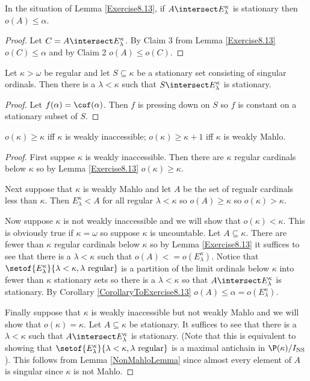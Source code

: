 \documentclass[oneside,12pt]{amsart}
\begin{document}
\begin{corollary}
\label{CorollaryToExercise8.13}
In the situation of Lemma \ref{Exercise8.13}, if $A\intersect E^{\kappa}_{\lambda}$ is stationary
then $o(A)\leq\alpha$.
\end{corollary}
\begin{proof}
Let $C=A\intersect E^{\kappa}_{\lambda}$. By Claim 3 from Lemma \ref{Exercise8.13} $o(C)\leq\alpha$ and
by Claim 2 $o(A)\leq o(C)$.
\end{proof}

\begin{lemma}
\label{NonMahloLemma}
Let $\kappa>\omega$ be regular and let $S\subseteq\kappa$ be a stationary set consisting of singular ordinals.
Then there is a $\lambda<\kappa$ such that $S\intersect E^{\kappa}_{\lambda}$ is stationary.
\end{lemma}
\begin{proof}
Let $f(\alpha)=\cof(\alpha)$. Then $f$ is pressing down on $S$ so $f$ is constant on a stationary subset of $S$.
\end{proof}

\begin{lemma}
$o(\kappa)\geq\kappa$ iff $\kappa$ is weakly inaccessible; $o(\kappa)\geq\kappa+1$ iff $\kappa$ is weakly Mahlo.
\end{lemma}
\begin{proof}
First suppse $\kappa$ is weakly inaccessible. Then there are $\kappa$ regular cardinals below $\kappa$
so by Lemma \ref{Exercise8.13} $o(\kappa)\geq\kappa$.

Next suppose that $\kappa$ is weakly Mahlo and let $A$ be the set of regualr cardinals less than $\kappa$.
Then $E^{\kappa}_{\lambda}<A$ for all regular $\lambda<\kappa$ so $o(A)\geq\kappa$ so $o(\kappa)>\kappa$.

Now suppose $\kappa$ is not weakly inaccessible and we will show that  $o(\kappa)<\kappa$.
This is obviously true if $\kappa=\omega$ so suppose $\kappa$ is uncountable.
Let $A\subseteq\kappa$. There are fewer than $\kappa$ regular cardinals below $\kappa$
so by Lemma \ref{Exercise8.13} it suffices to see that there is a $\lambda<\kappa$ such that
$o(A)<=o(E^{\kappa}_{\lambda})$.
Notice that $\setof{E^{\kappa}_{\lambda}}{\lambda < \kappa, \lambda \text{ regular}}$ is a partition of the limit ordinals
below $\kappa$
into fewer than $\kappa$ stationary sets so there is a $\lambda<\kappa$ so that $A\intersect E^{\kappa}_{\lambda}$
is stationary. By Corollary \ref{CorollaryToExercise8.13} $o(A)\leq\alpha=o(E^{\kappa}_{\lambda})$.

Finally suppose that $\kappa$ is weakly inaccessible but not weakly Mahlo and we will show that $o(\kappa)=\kappa$.
Let $A\subseteq\kappa$ be stationary. It suffices to see that there is a $\lambda<\kappa$ such that $A\intersect E^{\kappa}_{\lambda}$
is stationary. (Note that this is equivalent to showing that $\setof{E^{\kappa}_{\lambda}}{\lambda < \kappa, \lambda \text{ regular}}$
is a maximal antichain in $\P(\kappa) / I_{\text{NS}}$). This follows from Lemma \ref{NonMahloLemma} since almost every element
of $A$ is singular since $\kappa$ is not Mahlo.
\end{proof}
\end{document}
